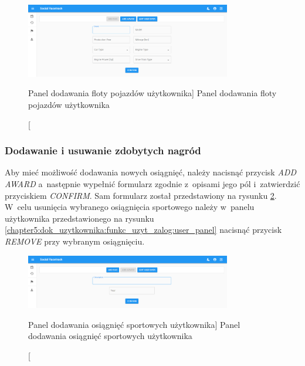 \documentclass[../Kamil_Kowalewski_Main.tex]{subfiles}
\begin{document}
{{{{                \begin{figure}[H]
                    \centering
                    \includegraphics[width=0.8\textwidth, keepaspectratio]
                    {img/chapter5/loggedin/add_car.png}
                    \caption
                    [Panel dodawania floty pojazdów użytkownika]
                    {Panel dodawania floty pojazdów użytkownika}
                    \label{chapter5:dok_uzytkownika:funkc_uzyt_zalog:add_car}
                \end{figure}
            }

            \subsubsection{Dodawanie i usuwanie zdobytych nagród}
            \label{chapter5:dok_uzytkownika:funkc_uzyt_zalog:konto_uzyt:dod_usun_nagrody} {
                Aby mieć możliwość dodawania nowych osiągnięć, należy nacisnąć przycisk
                \textit{ADD AWARD} a~następnie wypełnić formularz zgodnie z~opisami jego
                pól i~zatwierdzić przyciskiem \textit{CONFIRM}. Sam formularz został
                przedstawiony na rysunku
                \ref{chapter5:dok_uzytkownika:funkc_uzyt_zalog:add_award}. W~celu
                usunięcia wybranego osiągnięcia sportowego należy w~panelu użytkownika
                przedstawionego na rysunku
                \ref{chapter5:dok_uzytkownika:funkc_uzyt_zalog:user_panel}
                nacisnąć przycisk \textit{REMOVE} przy wybranym osiągnięciu.

                \begin{figure}[H]
                    \centering
                    \includegraphics[width=0.8\textwidth, keepaspectratio]
                    {img/chapter5/loggedin/add_award.png}
                    \caption
                    [Panel dodawania osiągnięć sportowych użytkownika]
                    {Panel dodawania osiągnięć sportowych użytkownika}
                    \label{chapter5:dok_uzytkownika:funkc_uzyt_zalog:add_award}
                \end{figure}
            }

}}}
\end{document}
